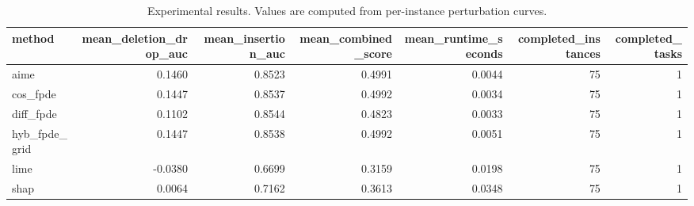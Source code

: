 \begin{table}[t]
\caption{Experimental results. Values are computed from per-instance perturbation curves.}
\label{tab:main_results_computed}
\centering
\begin{tabular}{lrrrrrr}
\toprule
method & mean\_deletion\_drop\_auc & mean\_insertion\_auc & mean\_combined\_score & mean\_runtime\_seconds & completed\_instances & completed\_tasks \\
\midrule
aime & 0.1460 & 0.8523 & 0.4991 & 0.0044 & 75 & 1 \\
cos\_fpde & 0.1447 & 0.8537 & 0.4992 & 0.0034 & 75 & 1 \\
diff\_fpde & 0.1102 & 0.8544 & 0.4823 & 0.0033 & 75 & 1 \\
hyb\_fpde\_grid & 0.1447 & 0.8538 & 0.4992 & 0.0051 & 75 & 1 \\
lime & -0.0380 & 0.6699 & 0.3159 & 0.0198 & 75 & 1 \\
shap & 0.0064 & 0.7162 & 0.3613 & 0.0348 & 75 & 1 \\
\bottomrule
\end{tabular}

\end{table}
